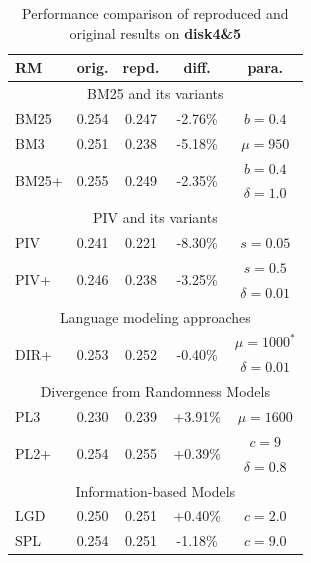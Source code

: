 \begin{table}[t]
\caption{Performance comparison of reproduced and original results on \textbf{disk4\&5}\label{tab:r1_disk45}}
\centering
\begin{tabular}{ |l|c|c|c|c| } \hline
\textbf{RM} & \textbf{orig.} & \textbf{repd.} & \textbf{diff.} & \textbf{para.} \\ \hline \hline 
\multicolumn{5}{|c|}{BM25 and its variants} \\ \hline 
BM25 & 0.254 & 0.247 & -2.76\% & $b=0.4$ \\ \hline
BM3 & 0.251 & 0.238 & -5.18\% & $\mu=950$ \\ \hline
\multirow{2}{*}{BM25+} & \multirow{2}{*}{0.255} & \multirow{2}{*}{0.249} & \multirow{2}{*}{-2.35\%} & $b=0.4$ \\
& & & & $\delta=1.0$ \\ \hline
\hline
\multicolumn{5}{|c|}{PIV and its variants} \\ \hline 
PIV & 0.241 & 0.221 & -8.30\% & $s=0.05$ \\ \hline
\multirow{2}{*}{PIV+} & \multirow{2}{*}{0.246} & \multirow{2}{*}{0.238} & \multirow{2}{*}{-3.25\%} & $s=0.5$ \\
& & & & $\delta=0.01$ \\ \hline
\hline
\multicolumn{5}{|c|}{Language modeling approaches} \\ \hline 
\multirow{2}{*}{DIR+} & \multirow{2}{*}{0.253} & \multirow{2}{*}{0.252} & \multirow{2}{*}{-0.40\%} & $\mu=1000^*$ \\
& & & & $\delta=0.01$ \\ \hline \hline 
\multicolumn{5}{|c|}{Divergence from Randomness Models} \\ \hline 
PL3 & 0.230 & 0.239 & +3.91\% & $\mu=1600$ \\ \hline
\multirow{2}{*}{PL2+} & \multirow{2}{*}{0.254} & \multirow{2}{*}{0.255} & \multirow{2}{*}{+0.39\%} & $c=9$ \\
& & & & $\delta=0.8$ \\ \hline
\hline
\multicolumn{5}{|c|}{Information-based Models} \\ \hline 
LGD & 0.250 & 0.251 & +0.40\% & $c=2.0$ \\ \hline
SPL & 0.254 & 0.251 & -1.18\% & $c=9.0$ \\ \hline
\end{tabular}
\end{table}


